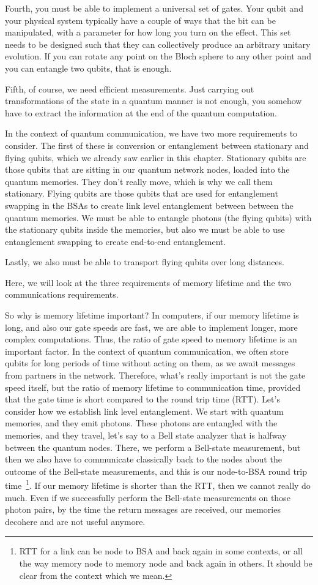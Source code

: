 Fourth, you must be able to implement a universal set of gates. Your qubit and your physical system typically have a couple of ways that the bit can be manipulated, with a parameter for how long you turn on the effect.  This set needs to be designed such that they can collectively produce an arbitrary unitary evolution. If you can rotate any point on the Bloch sphere to any other point and you can entangle two qubits, that is enough.

Fifth, of course, we need efficient measurements. Just carrying out transformations of the state in a quantum manner is not enough, you somehow have to extract the information at the end of the quantum computation.

In the context of quantum communication, we have two more requirements to consider. The first of these is conversion or entanglement between stationary and flying qubits, which we already saw earlier in this chapter. Stationary qubits are those qubits that are sitting in our quantum network nodes, loaded into the quantum memories. They don't really move, which is why we call them stationary. Flying qubits are those qubits that are used for entanglement swapping in the BSAs to create link level entanglement between between the quantum memories. We must be able to entangle photons (the flying qubits) with the stationary qubits inside the memories, but also we must be able to use entanglement swapping to create end-to-end entanglement.

Lastly, we also must be able to transport flying qubits over long distances.

Here, we will look at the three requirements of memory lifetime and the two communications requirements.

So why is memory lifetime important? In computers, if our memory lifetime is long, and also our gate speeds are fast, we are able to implement longer, more complex computations.  Thus, the ratio of gate speed to memory lifetime is an important factor. In the context of quantum communication, we often store qubits for long periods of time without acting on them, as we await messages from partners in the network.  Therefore, what's really important is not the gate speed itself, but the ratio of memory lifetime to communication time, 
provided that the gate time is short compared to the round trip time (RTT). Let's consider how we establish link level entanglement. We start with quantum memories, and they emit photons. These photons are entangled with the memories, and they travel, let's say to a Bell state analyzer that is halfway between the quantum nodes. There, we perform a Bell-state measurement, but then we also have to communicate classically back to the nodes about the outcome of the Bell-state measurements, and this is our node-to-BSA round trip time~\footnote{RTT for a link can be node to BSA and back again in some contexts, or all the way memory node to memory node and back again in others. It should be clear from the context which we mean.}. If our memory lifetime is shorter than the RTT, then we cannot really do much. Even if we successfully perform the Bell-state measurements on those photon pairs, by the time the return messages are received, our memories decohere and are not useful anymore.

